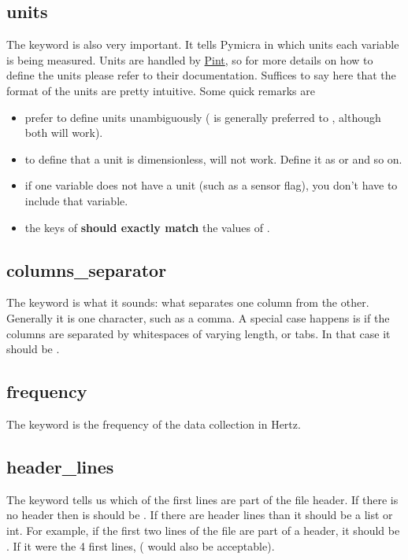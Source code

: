 \documentclass[a4paper,10pt,oneside]{sphinxmanual}
\begin{document}
\subsection{units}
\label{basics:units}
The  keyword is also very important. It tells Pymicra in which units
each variable is being measured. Units are handled by \href{https://pint.readthedocs.io/en/0.7.2/}{Pint}, so for more
details on how to define the units please refer to their documentation. Suffices
to say here that the format of the units are pretty intuitive. Some quick remarks
are
\begin{itemize}
\item {} 
prefer to define units unambiguously ( is generally preferred to , although both will work).

\item {} 
to define that a unit is dimensionless,  will not work. Define it as  or  and so on.

\item {} 
if one variable does not have a unit (such as a sensor flag), you don't have to include that variable.

\item {} 
the keys of  \textbf{should exactly match} the values of .

\end{itemize}


\subsection{columns\_separator}
\label{basics:columns-separator}
The  keyword is what it sounds: what separates one column
from the other.  Generally it is one character, such as a comma. A special case
happens is if the columns are separated by whitespaces of varying length, or
tabs. In that case it should be .


\subsection{frequency}
\label{basics:frequency}
The  keyword is the frequency of the data collection in Hertz.


\subsection{header\_lines}
\label{basics:header-lines}
The keyword  tells us which of the first lines are part of
the file header.  If there is no header then is should be . If there
are header lines than it should be a list or int. For example, if the first two
lines of the file are part of a header, it should be \sphinxcode{{[}0, 1{]}}. If it were the
4 first lines, \sphinxcode{{[}0, 1, 2, 3{]}} ( would also be acceptable).
\end{document}

